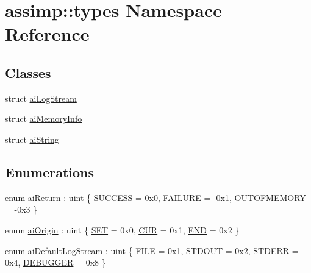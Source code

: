 \hypertarget{namespaceassimp_1_1types}{\section{assimp\+:\+:types Namespace Reference}
\label{namespaceassimp_1_1types}
}
\subsection*{Classes}
\begin{DoxyCompactItemize}
\item 
struct \hyperlink{structassimp_1_1types_1_1ai_log_stream}{ai\+Log\+Stream}
\item 
struct \hyperlink{structassimp_1_1types_1_1ai_memory_info}{ai\+Memory\+Info}
\item 
struct \hyperlink{structassimp_1_1types_1_1ai_string}{ai\+String}
\end{DoxyCompactItemize}
\subsection*{Enumerations}
\begin{DoxyCompactItemize}
\item 
enum \hyperlink{namespaceassimp_1_1types_ac24c8c8413fff5748d90ed5ac59f36ec}{ai\+Return} \+: uint \{ \hyperlink{namespaceassimp_1_1types_ac24c8c8413fff5748d90ed5ac59f36eca479a31975a3c92dafed7ba83fbb5c80a}{S\+U\+C\+C\+E\+S\+S} = 0x0, 
\hyperlink{namespaceassimp_1_1types_ac24c8c8413fff5748d90ed5ac59f36eca68982ac9bb93315ae1323727f48ae63f}{F\+A\+I\+L\+U\+R\+E} = -\/0x1, 
\hyperlink{namespaceassimp_1_1types_ac24c8c8413fff5748d90ed5ac59f36ecafb74af199e09672146a2825e81954e5c}{O\+U\+T\+O\+F\+M\+E\+M\+O\+R\+Y} = -\/0x3
 \}
\item 
enum \hyperlink{namespaceassimp_1_1types_a1fe9ed8ac4719b58cb780da43ff011e2}{ai\+Origin} \+: uint \{ \hyperlink{namespaceassimp_1_1types_a1fe9ed8ac4719b58cb780da43ff011e2ae817741974fb0c5357dec9139d1aee6d}{S\+E\+T} = 0x0, 
\hyperlink{namespaceassimp_1_1types_a1fe9ed8ac4719b58cb780da43ff011e2a76a75d2ea27ddd6aba4cc5835ffb67e8}{C\+U\+R} = 0x1, 
\hyperlink{namespaceassimp_1_1types_a1fe9ed8ac4719b58cb780da43ff011e2a77e7e37b6c7bf16620af6c60930cbae3}{E\+N\+D} = 0x2
 \}
\item 
enum \hyperlink{namespaceassimp_1_1types_a52da3a6c31d2b1f04a0f897a22c5b3a6}{ai\+Default\+Log\+Stream} \+: uint \{ \hyperlink{namespaceassimp_1_1types_a52da3a6c31d2b1f04a0f897a22c5b3a6a0635dd4225361cb6b8db05572f6e3d23}{F\+I\+L\+E} = 0x1, 
\hyperlink{namespaceassimp_1_1types_a52da3a6c31d2b1f04a0f897a22c5b3a6ab0f5987ab9641a174102f2d90e5213b7}{S\+T\+D\+O\+U\+T} = 0x2, 
\hyperlink{namespaceassimp_1_1types_a52da3a6c31d2b1f04a0f897a22c5b3a6a317b738737505e13bda6af6daf11b36c}{S\+T\+D\+E\+R\+R} = 0x4, 
\hyperlink{namespaceassimp_1_1types_a52da3a6c31d2b1f04a0f897a22c5b3a6a44c930f831ee861d3c59cea7d0fe2d08}{D\+E\+B\+U\+G\+G\+E\+R} = 0x8
 \}
\end{DoxyCompactItemize}
